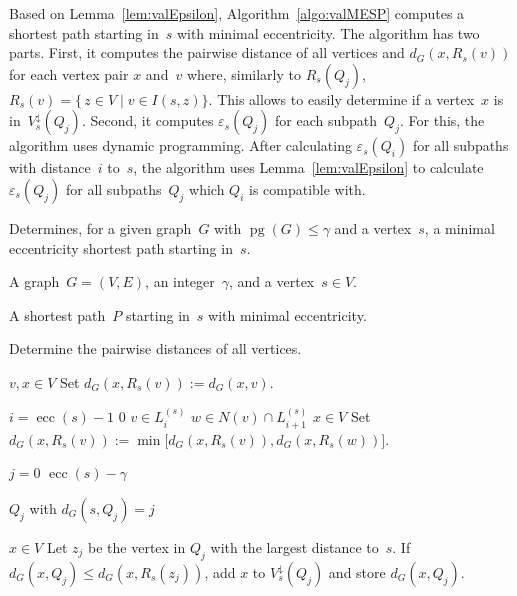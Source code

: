 \documentclass[10pt]{llncs}
\DeclareMathOperator{\pg}{pg}
\DeclareMathOperator{\ecc}{ecc}
\begin{document}
Based on Lemma~\ref{lem:valEpsilon}, Algorithm~\ref{algo:valMESP} computes a shortest path starting in~$s$ with minimal eccentricity.
The algorithm has two parts.
First, it computes the pairwise distance of all vertices and $d_G(x, R_s(v))$ for each vertex pair $x$ and~$v$ where, similarly to $R_s(Q_j)$, $R_s(v) = \{ \, z \in V \mid v \in I(s, z) \}$.
This allows to easily determine if a vertex~$x$ is in~$V^\downarrow_s(Q_j)$.
Second, it computes $\varepsilon_s(Q_j)$ for each subpath~$Q_j$.
For this, the algorithm uses dynamic programming.
After calculating $\varepsilon_s(Q_i)$ for all subpaths with distance~$i$ to~$s$, the algorithm uses Lemma~\ref{lem:valEpsilon} to calculate $\varepsilon_s(Q_j)$ for all subpaths~$Q_j$ which $Q_i$ is compatible with.

\begin{algorithm}
    [htb!]
    \caption
    {
        Determines, for a given graph~$G$ with $\pg(G) \leq \gamma$ and a vertex~$s$, a minimal eccentricity shortest path starting in~$s$.
    }
    \label{algo:valMESP}

\KwIn
{
    A graph~$G = (V, E)$, an integer~$\gamma$, and a vertex~$s \in V$.
}

\KwOut
{
    A shortest path~$P$ starting in~$s$ with minimal eccentricity.
}

Determine the pairwise distances of all vertices.
\label{line:pairwDistance}

\ForEach
{
    $v, x \in V$
}
{
    Set $d_G(x, R_s(v)) := d_G(x, v)$.
    \label{line:defaultR}
}

\For
{
    $i = \ecc(s) - 1$ \KwDownTo $0$
    \label{line:compRsStart}
}
{
    \ForEach
    {
        $v \in L_i^{(s)}$
    }
    {
        \ForEach
        {
            $w \in N(v) \cap L_{i+1}^{(s)}$
        }
        {
            \ForEach
            {
                $x \in V$
            }
            {
                Set $d_G(x, R_s(v)) := \min \big[ d_G(x, R_s(v)), d_G(x, R_s(w)) \big]$.
                \label{line:distRv}
            }
        }
    }
}

\For
{
    $j = 0$ \KwTo $\ecc(s) - \gamma$
    \label{line:QjLoop}
}
{
    \ForEach
    {
        $Q_j$ with $d_G(s, Q_j) = j$
        \label{line:selectQj}
    }
    {
        \ForEach
        {
            $x \in V$
            \label{line:xQjLoop}
        }
        {
            Let $z_j$ be the vertex in $Q_j$ with the largest distance to~$s$.
            If $d_G(x, Q_j) \leq d_G(x, R_s(z_j))$, add $x$ to $V^\downarrow_s(Q_j)$ and store $d_G(x, Q_j)$.
            \label{line:computeVsOj}
        }

}}
\end{algorithm}
\end{document}
